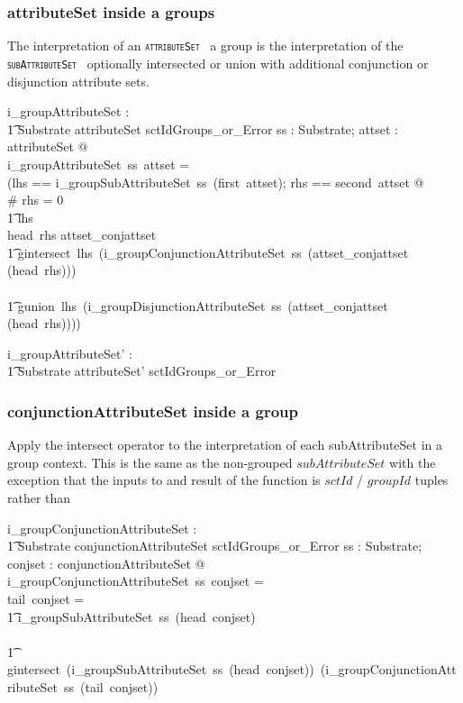 \documentclass{article}
\def\spec#1{{\tt \small \textsc{{#1}} }}
\begin{document}
\subsubsection{attributeSet inside a groups}
The interpretation of an \spec{attributeSet} a group is the interpretation of the \spec{subAttributeSet}
optionally intersected or union with additional conjunction or disjunction attribute sets.


\begin{axdef}
   i\_groupAttributeSet : \\
\t1 Substrate \fun attributeSet \fun sctIdGroups\_or\_Error
\where
   \forall ss : Substrate; attset : attributeSet @ \\
   i\_groupAttributeSet~ss~attset = \\
   (\LET lhs == i\_groupSubAttributeSet~ss~(first~attset); rhs == second~attset @ \\
 \IF \# rhs = 0 \THEN \\
 \t1 lhs \\
 \ELSE \IF head~rhs \in \ran attset\_conjattset \THEN \\
 \t1 gintersect~lhs~(i\_groupConjunctionAttributeSet~ss~(attset\_conjattset \inv (head~rhs))) \\
  \ELSE \\
  \t1 gunion~lhs~(i\_groupDisjunctionAttributeSet~ss~(attset\_conjattset \inv (head~rhs))))
\end{axdef}
\begin{axdef}
   i\_groupAttributeSet' : \\
\t1 Substrate \fun attributeSet' \fun sctIdGroups\_or\_Error
\end{axdef}

\subsubsection{conjunctionAttributeSet inside a group}
Apply the intersect operator to the interpretation of each  subAttributeSet in a group context. This is the same as the non-grouped $subAttributeSet$ with the exception that the inputs to and result of the function is $sctId$ / $groupId$ tuples rather than



\begin{axdef}
    i\_groupConjunctionAttributeSet : \\
\t1 Substrate \fun conjunctionAttributeSet \fun sctIdGroups\_or\_Error
\where
   \forall ss : Substrate;  conjset : conjunctionAttributeSet @ \\
   i\_groupConjunctionAttributeSet~ss~conjset = ~ \\
   \IF tail~conjset = \langle \rangle \THEN \\
   \t1 i\_groupSubAttributeSet~ss~(head~conjset) \\
\ELSE \\
\t1 gintersect~(i\_groupSubAttributeSet~ss~(head~conjset))~(i\_groupConjunctionAttributeSet~ss~(tail~conjset))
\end{axdef}
\end{document}
